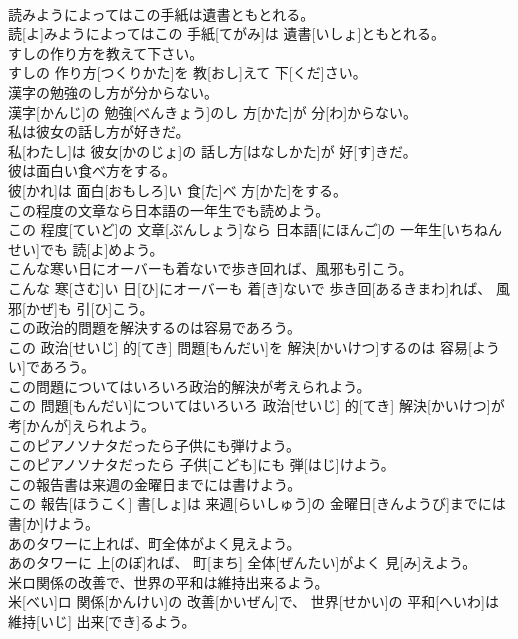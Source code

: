\documentclass[8pt]{extreport}
\begin{document}
\begin{CJK}{UTF8}{min}
\\	読みようによってはこの手紙は遺書ともとれる。	
\\	読[よ]みようによってはこの 手紙[てがみ]は 遺書[いしょ]ともとれる。
\\	すしの作り方を教えて下さい。	
\\	すしの 作り方[つくりかた]を 教[おし]えて 下[くだ]さい。
\\	漢字の勉強のし方が分からない。	
\\	漢字[かんじ]の 勉強[べんきょう]のし 方[かた]が 分[わ]からない。
\\	私は彼女の話し方が好きだ。	
\\	私[わたし]は 彼女[かのじょ]の 話し方[はなしかた]が 好[す]きだ。
\\	彼は面白い食べ方をする。	
\\	彼[かれ]は 面白[おもしろ]い 食[た]べ 方[かた]をする。
\\	この程度の文章なら日本語の一年生でも読めよう。	
\\	この 程度[ていど]の 文章[ぶんしょう]なら 日本語[にほんご]の 一年生[いちねんせい]でも 読[よ]めよう。
\\	こんな寒い日にオーバーも着ないで歩き回れば、風邪も引こう。	
\\	こんな 寒[さむ]い 日[ひ]にオーバーも 着[き]ないで 歩き回[あるきまわ]れば、 風邪[かぜ]も 引[ひ]こう。
\\	この政治的問題を解決するのは容易であろう。	
\\	この 政治[せいじ] 的[てき] 問題[もんだい]を 解決[かいけつ]するのは 容易[ようい]であろう。
\\	この問題についてはいろいろ政治的解決が考えられよう。	
\\	この 問題[もんだい]についてはいろいろ 政治[せいじ] 的[てき] 解決[かいけつ]が 考[かんが]えられよう。
\\	このピアノソナタだったら子供にも弾けよう。	
\\	このピアノソナタだったら 子供[こども]にも 弾[はじ]けよう。
\\	この報告書は来週の金曜日までには書けよう。	
\\	この 報告[ほうこく] 書[しょ]は 来週[らいしゅう]の 金曜日[きんようび]までには 書[か]けよう。
\\	あのタワーに上れば、町全体がよく見えよう。	
\\	あのタワーに 上[のぼ]れば、 町[まち] 全体[ぜんたい]がよく 見[み]えよう。
\\	米ロ関係の改善で、世界の平和は維持出来るよう。	
\\	米[べい]ロ 関係[かんけい]の 改善[かいぜん]で、 世界[せかい]の 平和[へいわ]は 維持[いじ] 出来[でき]るよう。

\end{CJK}
\end{document}
